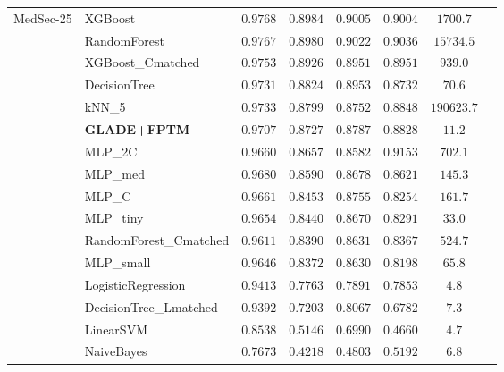 \documentclass[journal,10pt]{IEEEtran}
\begin{document}
\begin{longtable}{llcccccr}
\multirow{16}{*}{MedSec-25}
 & XGBoost                & $0.9768$ & $0.8984$ & $0.9005$ & $0.9004$ & $1700.7$   \\
 & RandomForest           & $0.9767$ & $0.8980$ & $0.9022$ & $0.9036$ & $15734.5$  \\
 & XGBoost\_Cmatched      & $0.9753$ & $0.8926$ & $0.8951$ & $0.8951$ & $939.0$    \\
 & DecisionTree           & $0.9731$ & $0.8824$ & $0.8953$ & $0.8732$ & $70.6$     \\
 & kNN\_5                 & $0.9733$ & $0.8799$ & $0.8752$ & $0.8848$ & $190623.7$ \\
 & \textbf{GLADE+FPTM}    & $\mathbf{0.9707}$ & $\mathbf{0.8727}$ & $\mathbf{0.8787}$ & $\mathbf{0.8828}$ & $\mathbf{11.2}$ \\
 & MLP\_2C                & $0.9660$ & $0.8657$ & $0.8582$ & $0.9153$ & $702.1$    \\
 & MLP\_med               & $0.9680$ & $0.8590$ & $0.8678$ & $0.8621$ & $145.3$    \\
 & MLP\_C                 & $0.9661$ & $0.8453$ & $0.8755$ & $0.8254$ & $161.7$    \\
 & MLP\_tiny              & $0.9654$ & $0.8440$ & $0.8670$ & $0.8291$ & $33.0$     \\
 & RandomForest\_Cmatched & $0.9611$ & $0.8390$ & $0.8631$ & $0.8367$ & $524.7$    \\
 & MLP\_small             & $0.9646$ & $0.8372$ & $0.8630$ & $0.8198$ & $65.8$     \\
 & LogisticRegression     & $0.9413$ & $0.7763$ & $0.7891$ & $0.7853$ & $4.8$      \\
 & DecisionTree\_Lmatched & $0.9392$ & $0.7203$ & $0.8067$ & $0.6782$ & $7.3$      \\
 & LinearSVM              & $0.8538$ & $0.5146$ & $0.6990$ & $0.4660$ & $4.7$      \\
 & NaiveBayes             & $0.7673$ & $0.4218$ & $0.4803$ & $0.5192$ & $6.8$      \\
\midrule


\end{longtable}
\end{document}
